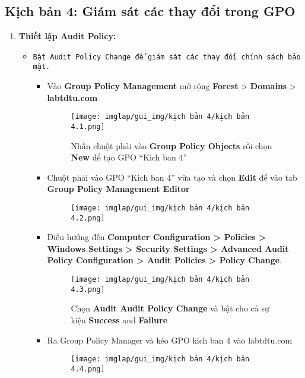 \documentclass[13pt]{article}
\begin{document}
        \subsection{Kịch bản 4: Giám sát các thay đổi trong GPO}
        \begin{enumerate}
            \item \textbf{Thiết lập Audit Policy:}
            \begin{itemize}
                \item \texttt{Bật Audit Policy Change để giám sát các thay đổi chính sách bảo mật.}
                \begin{itemize}
                    \item Vào \textbf{Group Policy Management} mở rộng \textbf{Forest} > \textbf{Domains} > \textbf{labtdtu.com}  
\begin{figure}[H]
                    \centering
                    \texttt{[image: imglap/gui\_img/kịch bản 4/kịch bản 4.1.png]}
                    \caption{Nhấn chuột phải vào \textbf{Group Policy Objects} rồi chọn \textbf{New }để tạo GPO “Kich ban 4” }
                    \label{fig:enter-label}
                \end{figure}
\newpage
                \item Chuột phải vào GPO “Kich ban 4” vừa tạo và chọn \textbf{Edit }để vào tab \textbf{Group Policy Management Editor} 
\begin{figure}[H]
                    \centering
                    \texttt{[image: imglap/gui\_img/kịch bản 4/kịch bản 4.2.png]}
                    \caption{}
                    \label{fig:enter-label}
                \end{figure}
\newpage
                                \item Điều hướng đến \textbf{Computer Configuration > Policies > Windows Settings > Security Settings > Advanced Audit Policy Configuration > Audit Policies > Policy Change}.
\begin{figure}[H]
    \centering
    \texttt{[image: imglap/gui\_img/kịch bản 4/kịch bản 4.3.png]}
    \caption{Chọn \textbf{Audit Audit Policy Change} và bật cho cả sự kiện \textbf{Success }and \textbf{Failure} }
    \label{fig:enter-label}
\end{figure}
\item Ra Group Policy Manager và kéo GPO kich ban 4 vào labtdtu.com 
\begin{figure}[H]
    \centering
    \texttt{[image: imglap/gui\_img/kịch bản 4/kịch bản 4.4.png]}

\end{figure}
\end{itemize}
\end{itemize}
\end{enumerate}
\end{document}
